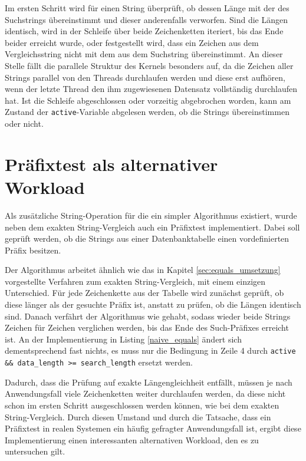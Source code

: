Im ersten Schritt wird für einen String überprüft, ob dessen Länge mit der des Suchstrings übereinstimmt und dieser anderenfalls verworfen.
Sind die Längen identisch, wird in der Schleife über beide Zeichenketten iteriert, bis das Ende beider erreicht wurde, oder festgestellt wird, dass ein Zeichen aus dem Vergleichsstring nicht mit dem aus dem Suchstring übereinstimmt.
An dieser Stelle fällt die parallele Struktur des Kernels besonders auf, da die Zeichen aller Strings parallel von den Threads durchlaufen werden und diese erst aufhören, wenn der letzte Thread den ihm zugewiesenen Datensatz vollständig durchlaufen hat.
Ist die Schleife abgeschlossen oder vorzeitig abgebrochen worden, kann am Zustand der \texttt{active}-Variable abgelesen werden, ob die Strings übereinstimmen oder nicht.

\section{Präfixtest als alternativer Workload}

Als zusätzliche String-Operation für die ein simpler Algorithmus existiert, wurde neben dem exakten String-Vergleich auch ein Präfixtest implementiert.
Dabei soll geprüft werden, ob die Strings aus einer Datenbanktabelle einen vordefinierten Präfix besitzen.

Der Algorithmus arbeitet ähnlich wie das in Kapitel \ref{sec:equals_umsetzung} vorgestellte Verfahren zum exakten String-Vergleich, mit einem einzigen Unterschied.
Für jede Zeichenkette aus der Tabelle wird zunächst geprüft, ob diese länger als der gesuchte Präfix ist, anstatt zu prüfen, ob die Längen identisch sind.
Danach verfährt der Algorithmus wie gehabt, sodass wieder beide Strings Zeichen für Zeichen verglichen werden, bis das Ende des Such-Präfixes erreicht ist.
An der Implementierung in Listing \ref{naive_equals} ändert sich dementsprechend fast nichts, es muss nur die Bedingung in Zeile 4 durch \texttt{active \&\& data\_length >= search\_length} ersetzt werden.

Dadurch, dass die Prüfung auf exakte Längengleichheit entfällt, müssen je nach Anwendungsfall viele Zeichenketten weiter durchlaufen werden, da diese nicht schon im ersten Schritt ausgeschlossen werden können, wie bei dem exakten String-Vergleich.
Durch diesen Umstand und durch die Tatsache, dass ein Präfixtest in realen Systemen ein häufig gefragter Anwendungsfall ist, ergibt diese Implementierung einen interessanten alternativen Workload, den es zu untersuchen gilt.


